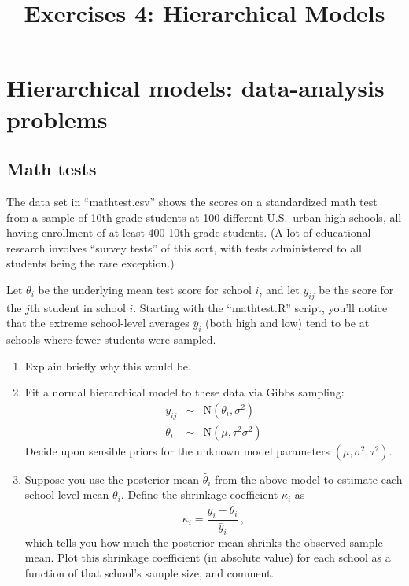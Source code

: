 \documentclass{article}
\title{Exercises 4: Hierarchical Models}
\date{}  %
\begin{document}
\maketitle%


\section{Hierarchical models: data-analysis problems}

\subsection{Math tests}

The data set in ``mathtest.csv'' shows the scores on a standardized math test from a sample of 10th-grade students at 100 different U.S.~urban high schools, all having enrollment of at least 400 10th-grade students.  (A lot of educational research involves ``survey tests'' of this sort, with tests administered to all students being the rare exception.)

Let $\theta_i$ be the underlying mean test score for school $i$, and let $y_{ij}$ be the score for the $j$th student in school $i$.  Starting with the ``mathtest.R'' script, you'll notice that the extreme school-level averages $\bar{y}_i$ (both high and low) tend to be at schools where fewer students were sampled.

\begin{enumerate}
\item Explain briefly why this would be.
\item Fit a normal hierarchical model to these data via Gibbs sampling:
\begin{eqnarray*}
y_{ij} &\sim& \mbox{N}(\theta_i, \sigma^2) \\
\theta_i &\sim& \mbox{N}(\mu, \tau^2 \sigma^2)
\end{eqnarray*}
Decide upon sensible priors for the unknown model parameters $(\mu, \sigma^2, \tau^2)$.

\item Suppose you use the posterior mean $\hat{\theta}_i$ from the above model to estimate each school-level mean $\theta_i$.  Define the shrinkage coefficient $\kappa_i$ as
$$
\kappa_i = \frac{ \bar{y}_i - \hat{\theta}_i}{\bar{y}_i} \, ,
$$
which tells you how much the posterior mean shrinks the observed sample mean.  Plot this shrinkage coefficient (in absolute value) for each school as a function of that school's sample size, and comment.

\end{enumerate}
\end{document}
